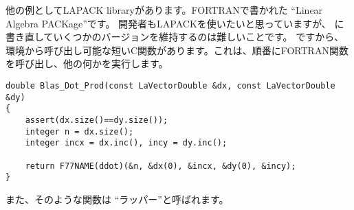 他の例としてLAPACK libraryがあります。FORTRANで書かれた ``Linear Algebra PACKage''です。
\CCpp 開発者もLAPACKを使いたいと思っていますが、 \CCpp に書き直していくつかのバージョンを維持するのは難しいことです。 
ですから、 \CCpp 環境から呼び出し可能な短いC関数があります。これは、順番にFORTRAN関数を呼び出し、他の何かを実行します。

\begin{lstlisting}[style=customc]
double Blas_Dot_Prod(const LaVectorDouble &dx, const LaVectorDouble &dy)
{
    assert(dx.size()==dy.size());
    integer n = dx.size();
    integer incx = dx.inc(), incy = dy.inc();

    return F77NAME(ddot)(&n, &dx(0), &incx, &dy(0), &incy);
}
\end{lstlisting}

また、そのような関数は ``ラッパー''と呼ばれます。
